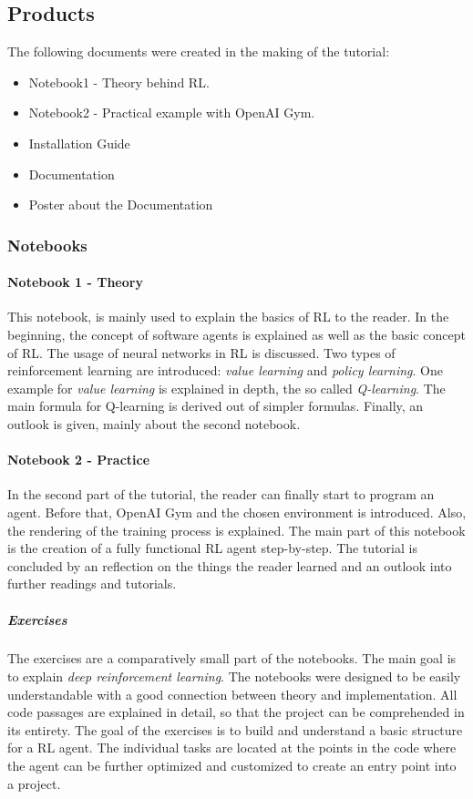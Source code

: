 \documentclass[10pt,a4paper]{article}
\begin{document}
		\subsection{Products}
		The following documents were created in the making of the tutorial:
		\begin{itemize}
			\item Notebook1 - Theory behind RL.
			\item Notebook2 - Practical example with OpenAI Gym.
			\item Installation Guide
			\item Documentation
			\item Poster about the Documentation
		\end{itemize}
		\subsubsection{Notebooks}
		
			\paragraph{Notebook 1 - Theory}
				This notebook, is mainly used to explain the basics of RL to the reader.
				In the beginning, the concept of software agents is explained as well as the basic concept of RL.
				The usage of neural networks in RL is discussed.
				Two types of reinforcement learning are introduced: \textit{value learning} and \textit{policy learning}.
				One example for \textit{value learning} is explained in depth, the so called \textit{Q-learning}. 
				The main formula for Q-learning is derived out of simpler formulas.
				Finally, an outlook is given, mainly about the second notebook.
			\paragraph{Notebook 2 - Practice}
				In the second part of the tutorial, the reader can finally start to program an agent. 
				Before that, OpenAI Gym and the chosen environment is introduced.
				Also, the rendering of the training process is explained.
				The main part of this notebook is the creation of a fully functional RL agent step-by-step.
				The tutorial is concluded by an reflection on the things the reader learned and an outlook into further readings and tutorials.
			\subparagraph{Exercises}
			The exercises are a comparatively small part of the notebooks. The main goal is to explain \textit{deep reinforcement learning}. The notebooks were designed to be easily understandable with a good connection between theory and implementation. All code passages are explained in detail, so that the project can be comprehended in its entirety. The goal of the exercises is to build and understand a basic structure for a RL agent. The individual tasks are located at the points in the code where the agent can be further optimized and customized to create an entry point into a project.
\end{document}
